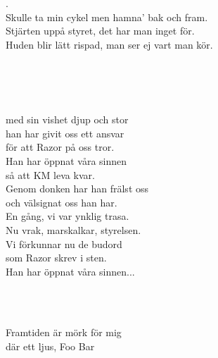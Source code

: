 .\\
Skulle ta min cykel men hamna' bak och fram.\\
Stjärten uppå styret, det har man inget för.\\
Huden blir lätt rispad, man ser ej vart man kör.

 \\


 \\       
\author{Text: Martin Johnsson}

 \\
med sin vishet djup och stor \\
han har givit oss ett ansvar \\
för att Razor på oss tror. \\
Han har öppnat våra sinnen \\
så att KM leva kvar. \\
Genom donken har han frälst oss \\
och välsignat oss han har. \\
En gång, vi var ynklig trasa. \\
Nu vrak, marskalkar, styrelsen. \\
Vi förkunnar nu de budord \\
som Razor skrev i sten. \\
Han har öppnat våra sinnen...

\newpage 


 \\       
\author{Text: Sebastian Stureborg}

 \\
Framtiden är mörk för mig \\
där ett ljus, Foo Bar

 \\



 \\       
\author{Text: Martin Johnsson}

